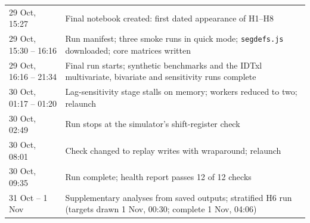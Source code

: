 \begin{table}[tbp]
\begin{tabular}{@{}lL{0.74\textwidth}@{}}
29 Oct, 15:27 & Final notebook created: first dated appearance of H1--H8 \\
29 Oct, 15:30 -- 16:16 & Run manifest; three smoke runs in quick mode; \texttt{segdefs.js} downloaded; core matrices written \\
29 Oct, 16:16 -- 21:34 & Final run starts; synthetic benchmarks and the IDTxl multivariate, bivariate and sensitivity runs complete \\
30 Oct, 01:17 -- 01:20 & Lag-sensitivity stage stalls on memory; workers reduced to two; relaunch \\
30 Oct, 02:49 & Run stops at the simulator's shift-register check \\
30 Oct, 08:01 & Check changed to replay writes with wraparound; relaunch \\
30 Oct, 09:35 & Run complete; health report passes 12 of 12 checks \\
31 Oct -- 1 Nov & Supplementary analyses from saved outputs; stratified H6 run (targets drawn 1 Nov, 00:30; complete 1 Nov, 04:06) \\
\bottomrule
\end{tabular}
\end{table}

